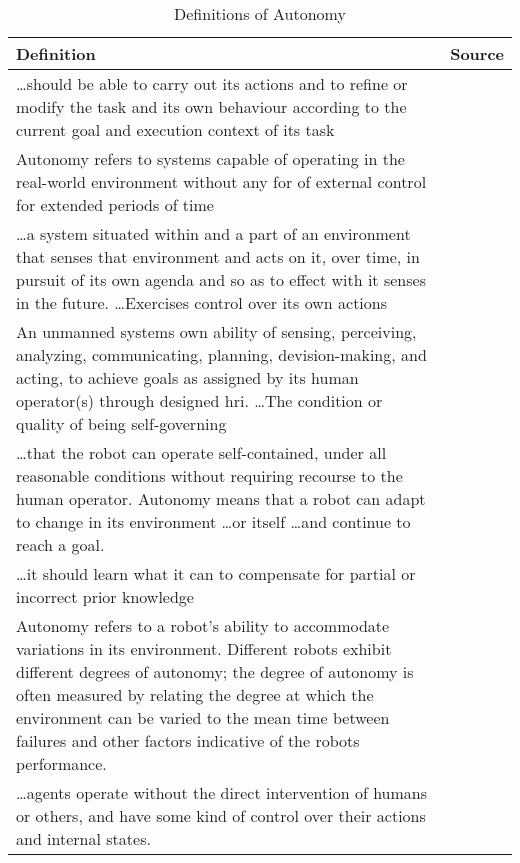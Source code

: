 \begin{table}\centering
  \caption{Definitions of Autonomy}
  \label{tab:autonomy_definitions}
  \begin{tabularx}{\textwidth}{X p{3cm}}\toprule
    Definition & Source \\ \midrule
    \ldots should be able to carry out its actions and to refine or modify the task and its own behaviour according to the current goal and execution context of its task & \citet{Alami1998}\\
    Autonomy refers to systems capable of operating in the real-world environment without any for of external control for extended periods of time & \citet{Bekey2005}\\
    \ldots a system situated within and a part of an environment that senses that environment and acts on it, over time, in pursuit of its own agenda and so as to effect with it senses in the future. \ldots Exercises control over its own actions & \citet{Franklin1997} \\
    An unmanned systems own ability of sensing, perceiving, analyzing, communicating, planning, devision-making, and acting, to achieve goals as assigned by its human operator(s) through designed \acrshort{hri}. \ldots The condition or quality of being self-governing & \citet{Huang2004}\\
    \ldots that the robot can operate self-contained, under all reasonable conditions without requiring recourse to the human operator. Autonomy means that a robot can adapt to change in its environment \ldots or itself \ldots and continue to reach a goal. & \citet{Murphy2000}\\
    \ldots it should learn what it can to compensate for partial or incorrect prior knowledge & \citet{Russell2009} \\
    Autonomy refers to a robot's ability to accommodate variations in its environment. Different robots exhibit different degrees of autonomy; the degree of autonomy is often measured by relating the degree at which the environment can be varied to the mean time between failures and other factors indicative of the robots performance. & \citet{Thrun2004}\\
    \ldots agents operate without the direct intervention of humans or others, and have some kind of control over their actions and internal states. & \citet{Wooldridge1995}\\\bottomrule
  \end{tabularx}
\end{table}

